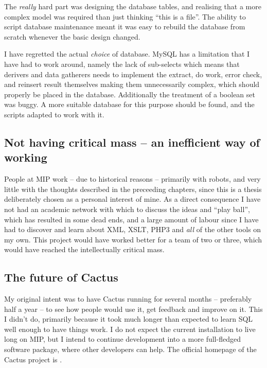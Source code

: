 The \textit{really} hard part was designing the database tables, and
realising that a more complex model was required than just thinking
``this is a file''.  The ability to script database maintenance
meant it was easy to rebuild the database from scratch whenever the
basic design changed.  

I have regretted the actual \textit{choice} of database.  MySQL has a
limitation that I have had to work around, namely the lack of
sub-selects which means that derivers and data gatherers needs to
implement the extract, do work, error check, and reinsert result
themselves making them unnecessarily complex, which should properly be
placed in the database.  Additionally the treatment of a boolean set
was buggy. A more suitable database for this purpose should be found,
and the scripts adapted to work with it.

\subsection*{Not having critical mass -- an inefficient way of working}

People at MIP work -- due to historical reasons -- primarily with
robots, and very little with the thoughts described in the preceeding
chapters, since this is a thesis deliberately chosen as a personal
interest of mine.  As a direct consequence I have not had an academic
network with which to discuss the ideas and ``play ball'', which has
resulted in some dead ends, and a large amount of labour since I have
had to discover and learn about XML, XSLT, PHP3 and \textit{all} of
the other tools on my own.  This project would have worked better for
a team of two or three, which would have reached the intellectually
critical mass.




\subsection*{The future of Cactus}

My original intent was to have Cactus running for several months --
preferably half a year -- to see how people would use it, get feedback
and improve on it.  This I didn't do, primarily because it took much
longer than expected to learn SQL well enough to have things work.  I
do not expect the current installation to live long on MIP, but I
intend to continue development into a more full-fledged software
package, where other developers can help.  The official homepage of
the Cactus project is
.

